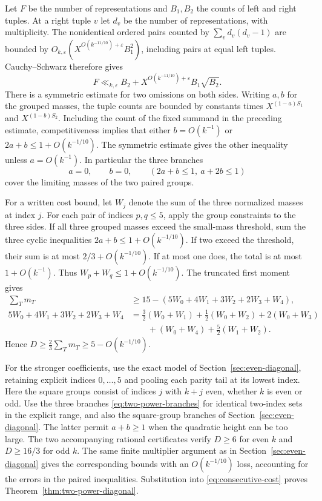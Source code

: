 \documentclass[11pt,reqno]{amsart}
\newcommand{\eps}{\varepsilon}
\begin{document}
Let \(F\) be the number of representations and \(B_1,B_2\)
the counts of left and right tuples. At a right tuple \(v\)
let \(d_v\) be the number of representations, with multiplicity.
The nonidentical ordered pairs counted by \(\sum_v d_v(d_v-1)\)
are bounded by \(O_{k,\eps}(X^{O(k^{-11/10})+\eps}B_1^2)\),
including pairs at equal left tuples. Cauchy--Schwarz therefore
gives
\[
 F\ll_{k,\eps} B_2+X^{O(k^{-11/10})+\eps}B_1\sqrt{B_2}.
\]
There is a symmetric estimate for two omissions on both sides.
Writing \(a,b\) for the grouped masses, the tuple counts are
bounded by constants times \(X^{(1-a)S_1}\) and
\(X^{(1-b)S_2}\). Including the count of the fixed summand in
the preceding estimate, competitiveness implies that either
\(b=O(k^{-1})\) or \(2a+b\le1+O(k^{-1/10})\).
The symmetric estimate gives the other inequality unless
\(a=O(k^{-1})\). In particular the three branches
\begin{equation}\label{eq:two-power-branches}
 a=0,\qquad b=0,\qquad (2a+b\le1,\ a+2b\le1)
\end{equation}
cover the limiting masses of the two paired groups.

For a written cost bound, let \(W_j\) denote the sum of the
three normalized masses at index \(j\). For each pair of indices
\(p,q\le5\), apply the group constraints to the three sides.
If all three grouped masses exceed the small-mass threshold,
sum the three cyclic inequalities \(2a+b\le1+O(k^{-1/10})\).
If two exceed the threshold, their sum is at most
\(2/3+O(k^{-1/10})\). If at most one does, the total is
at most \(1+O(k^{-1})\). Thus \(W_p+W_q\le1+O(k^{-1/10})\).
The truncated first moment gives
\[
 \begin{aligned}
 \sum_T m_T
 &\ge15-(5W_0+4W_1+3W_2+2W_3+W_4),\\
 5W_0+4W_1+3W_2+2W_3+W_4
 &=\tfrac32(W_0+W_1)+\tfrac12(W_0+W_2)+2(W_0+W_3)\\
 &\qquad +(W_0+W_4)+\tfrac52(W_1+W_2).
 \end{aligned}
\]
Hence \(D\ge\tfrac23\sum_T m_T\ge5-O(k^{-1/10})\).

For the stronger coefficients, use the exact model of
Section~\ref{sec:even-diagonal}, retaining explicit indices
\(0,\ldots,5\) and pooling each parity tail at its lowest index.
Here the square groups consist of indices \(j\) with \(k+j\)
even, whether \(k\) is even or odd. Use the three branches
\eqref{eq:two-power-branches} for identical two-index sets
in the explicit range, and also the square-group branches
of Section~\ref{sec:even-diagonal}. The latter permit
\(a+b\ge1\) when the quadratic height can be too large.
The two accompanying rational certificates verify \(D\ge6\)
for even \(k\) and \(D\ge16/3\) for odd \(k\).
The same finite multiplier argument as in
Section~\ref{sec:even-diagonal} gives the corresponding
bounds with an \(O(k^{-1/10})\) loss, accounting for the
errors in the paired inequalities. Substitution into
\eqref{eq:consecutive-cost} proves Theorem~\ref{thm:two-power-diagonal}.
\end{document}
